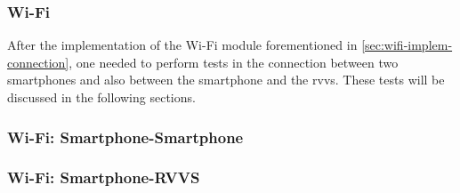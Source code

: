 \subsubsection{Wi-Fi}%
\label{sec:wifi-test}
%
After the implementation of the Wi-Fi module forementioned in \ref{sec:wifi-implem-connection}, one needed to perform tests in the connection between two smartphones and also between the smartphone and the \gls{rvvs}. These tests will be discussed in the following sections. 
%
\subsubsection{Wi-Fi: Smartphone-Smartphone}
\label{sec:wifi-phone-phone}
%
\subsubsection{Wi-Fi: Smartphone-RVVS}
\label{sec:wifi-phone-rvvs}
%